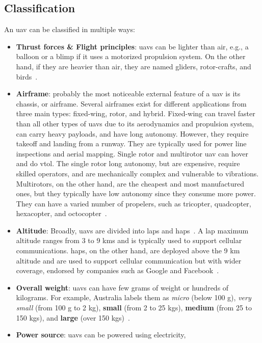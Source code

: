 \subsection{Classification}%
\label{sec:classification}
An \gls{uav} can be classified in multiple ways:
\begin{itemize}
\item \textbf{Thrust forces \& Flight principles}: \glspl{uav} can be lighter
  than air, e.g., a balloon or a blimp if it uses a motorized propulsion
  system. On the other hand, if they are heavier than air, they are named
  gliders, rotor-crafts, and birds~\cite{mohsan2022towards}.
\item \textbf{Airframe}: probably the most noticeable external feature of a
  \gls{uav} is its chassis, or airframe. Several airframes exist for different
  applications from three main types: fixed-wing, rotor, and
  hybrid. Fixed-wing can travel faster than all other types of \glspl{uav} due
  to its aerodynamics and propulsion system, can carry heavy payloads, and have
  long autonomy. However, they require takeoff and landing from a runway. They
  are typically used for power line inspections and aerial mapping. Single rotor
  and multirotor \gls{uav} can hover and do \gls{vtol}. The single rotor long
  autonomy, but are expensive, require skilled operators, and are mechanically
  complex and vulnerable to vibrations. Multirotors, on the other hand, are the
  cheapest and most manufactured ones, but they typically have low autonomy
  since they consume more power. They can have a varied number of propelers,
  such as tricopter, quadcopter, hexacopter, and octocopter~\cite{mohsan2022towards}.
\item \textbf{Altitude}: Broadly, \glspl{uav} are divided into \glspl{lap} and
  \glspl{hap}~. A \gls{lap} maximum altitude ranges from 3 to 9 kms and is
  typically used to support cellular communications. \glspl{hap}, on the other
  hand, are deployed above the 9 km altitude and are used to support cellular
  communication but with wider coverage, endorsed by companies such as Google
  and Facebook~\cite{mohsan2022towards}.
%  
\item \textbf{Overall weight}: \glspl{uav} can have few grams of weight or
  hundreds of kilograms. For example, Australia labels them as \emph{micro}
  (below 100 g),
  \emph{very small} (from 100 g to 2 kg), \textbf{small} (from 2 to 25 kgs),
  \textbf{medium} (from 25 to 150 kgs), and \textbf{large} (over
  150 kgs)~\cite{alladi2022UAVBlockain}.
%  
\item \textbf{Power source}: \glspl{uav} can be powered using electricity,

\end{itemize}

